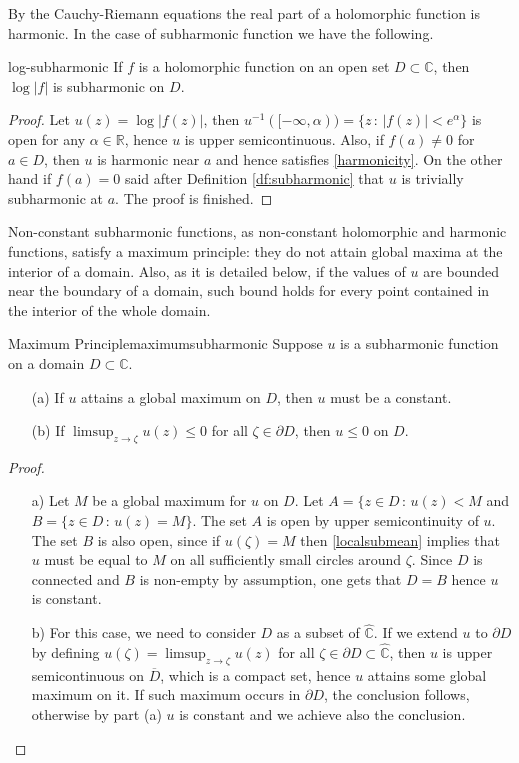 By the Cauchy-Riemann equations the real part of a holomorphic function is harmonic. In the case of subharmonic function we have the following.

\begin{mytheo}{}{log-subharmonic}
If $f$ is a holomorphic function on an open set $D\subset \mathbb{C}$, then $\log|f|$ is subharmonic on $D$.
\end{mytheo}

\begin{proof}
Let $u(z) = \log|f(z)|$, then $u^{-1}([-\infty,\alpha)) = \{z\,:\, |f(z)| < e^{\alpha}\}$ is open for any $\alpha\in \mathbb{R}$, hence $u$ is upper semicontinuous. Also, if $f(a)\neq 0$ for $a\in D$, then $u$ is harmonic near $a$ and hence satisfies \eqref{harmonicity}. On the other hand if $f(a)=0$ said after Definition \ref{df:subharmonic} that $u$ is trivially subharmonic at $a$. The proof is finished.
\end{proof}

Non-constant subharmonic functions, as  non-constant holomorphic and harmonic functions, satisfy a maximum principle: they do not attain global maxima at the interior of a domain. Also, as it is detailed below, if the values of $u$ are bounded near the boundary of a domain, such bound holds for every point contained in the interior of the whole domain. 

\begin{mytheo}{Maximum Principle}{maximumsubharmonic}
Suppose $u$ is a subharmonic function on a domain $D\subset \mathbb{C}$.
\begin{enumerate}
\item [(a)] If $u$ attains a global maximum on $D$, then $u$ must be a constant.\\
\item [(b)] If $\limsup_{z\rightarrow \zeta}u(z) \leq 0$ for all $\zeta\in \partial D$, then $u\leq 0$ on $D$.
\end{enumerate}
\end{mytheo}

\begin{proof}
\begin{enumerate}
\item [a)] Let $M$ be a global maximum for $u$ on $D$. Let $A=\{z\in D\,:\,u(z)<M$ and $B=\{z\in D\,:\,u(z)=M\}$. The set $A$ is open by upper semicontinuity of $u$. The set $B$ is also open, since if $u(\zeta)=M$ then \eqref{localsubmean} implies that $u$ must be equal to $M$ on all sufficiently small circles around $\zeta$. Since $D$ is connected and $B$ is non-empty by assumption, one gets that $D=B$ hence $u$ is constant.
\item [b)] For this case, we need to consider $D$ as a subset of $\widehat{\mathbb{C}}$. If we extend $u$ to $\partial D$ by defining $u(\zeta) = \limsup_{z\rightarrow \zeta}u(z)$ for all $\zeta\in \partial D\subset \widehat{\mathbb{C}}$, then $u$ is upper semicontinuous on $\overline{D}$, which is a compact set, hence $u$ attains some global maximum on it. If such maximum occurs in $\partial D$, the conclusion follows, otherwise by part (a) $u$ is constant and we achieve also the conclusion. 
\end{enumerate}
\end{proof}

